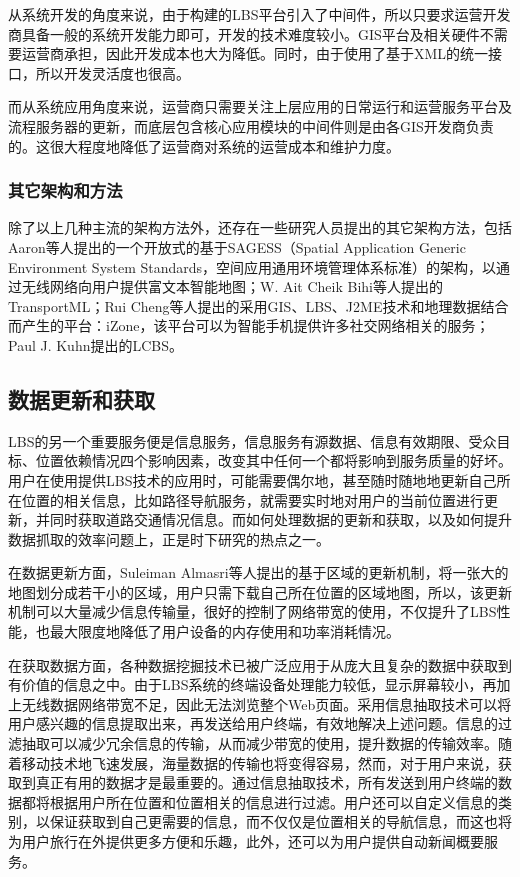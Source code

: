 \documentclass{article}
\begin{document}
\begin{CJK}{UTF8}{gbsn}
	从系统开发的角度来说，由于构建的LBS平台引入了中间件，所以只要求运营开发商具备一般的系统开发能力即可，开发的技术难度较小。GIS平台及相关硬件不需要运营商承担，因此开发成本也大为降低。同时，由于使用了基于XML的统一接口，所以开发灵活度也很高。

	而从系统应用角度来说，运营商只需要关注上层应用的日常运行和运营服务平台及流程服务器的更新，而底层包含核心应用模块的中间件则是由各GIS开发商负责的。这很大程度地降低了运营商对系统的运营成本和维护力度。

	\subsubsection{其它架构和方法}
  除了以上几种主流的架构方法外，还存在一些研究人员提出的其它架构方法，包括Aaron等人提出的一个开放式的基于SAGESS（Spatial Application Generic Environment System Standards，空间应用通用环境管理体系标准）的架构，以通过无线网络向用户提供富文本智能地图\cite{L05}；W. Ait Cheik Bihi等人提出的TransportML\cite{L03}；Rui Cheng等人提出的采用GIS、LBS、J2ME技术和地理数据结合而产生的平台：iZone，该平台可以为智能手机提供许多社交网络相关的服务\cite{L11}；Paul J. Kuhn提出的LCBS\cite{L04}。

	\subsection{数据更新和获取}
  LBS的另一个重要服务便是信息服务，信息服务有源数据、信息有效期限、受众目标、位置依赖情况四个影响因素\cite{D06}，改变其中任何一个都将影响到服务质量的好坏。用户在使用提供LBS技术的应用时，可能需要偶尔地，甚至随时随地地更新自己所在位置的相关信息，比如路径导航服务，就需要实时地对用户的当前位置进行更新，并同时获取道路交通情况信息。而如何处理数据的更新和获取，以及如何提升数据抓取的效率问题上，正是时下研究的热点之一。
   
  在数据更新方面，Suleiman Almasri等人提出的基于区域的更新机制\cite{L12}，将一张大的地图划分成若干小的区域，用户只需下载自己所在位置的区域地图，所以，该更新机制可以大量减少信息传输量，很好的控制了网络带宽的使用，不仅提升了LBS性能，也最大限度地降低了用户设备的内存使用和功率消耗情况。

  在获取数据方面，各种数据挖掘技术已被广泛应用于从庞大且复杂的数据中获取到有价值的信息之中\cite{D09}。由于LBS系统的终端设备处理能力较低，显示屏幕较小，再加上无线数据网络带宽不足，因此无法浏览整个Web页面。采用信息抽取技术可以将用户感兴趣的信息提取出来，再发送给用户终端，有效地解决上述问题\cite{D11}。信息的过滤抽取可以减少冗余信息的传输，从而减少带宽的使用，提升数据的传输效率。随着移动技术地飞速发展，海量数据的传输也将变得容易，然而，对于用户来说，获取到真正有用的数据才是最重要的。通过信息抽取技术，所有发送到用户终端的数据都将根据用户所在位置和位置相关的信息进行过滤。用户还可以自定义信息的类别，以保证获取到自己更需要的信息，而不仅仅是位置相关的导航信息，而这也将为用户旅行在外提供更多方便和乐趣\cite{D10}，此外，还可以为用户提供自动新闻概要服务\cite{D02}。


\end{CJK}
\end{document}
